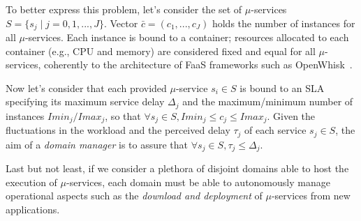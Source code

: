



To better express this problem, let's consider the set of $\mu$-services $S = \{s_j \mid j = 0,1,...,J\}$.
Vector $\bar{c} = (c_1, ..., c_J)$ holds the number of instances for all $\mu$-services. Each instance is bound to a container; resources allocated to each container 
(e.g., CPU and memory) are considered fixed and equal for all $\mu$-services, coherently to the architecture of FaaS frameworks such as OpenWhisk~\cite{OpenWhisk}.

Now let's consider that each provided $\mu$-service $s_i \in S$ is bound to an SLA specifying its maximum service delay $\Delta_j$ and the maximum/minimum number of instances $Imin_{j}/Imax_{j}$, so that $\forall s_j \in S, Imin_j \le c_j \le Imax_j$. %
Given the fluctuations in the workload and the perceived delay $\tau_j$ of each service $s_j \in S$, the aim of a \textit{domain manager} is to assure that $\forall s_j \in S, \tau_j \le \Delta_j$.

Last but not least, if we consider a plethora of disjoint domains able to host the execution of $\mu$-services, each domain must be able to autonomously manage operational aspects such as the \textit{download and deployment} of $\mu$-services from new applications. 


